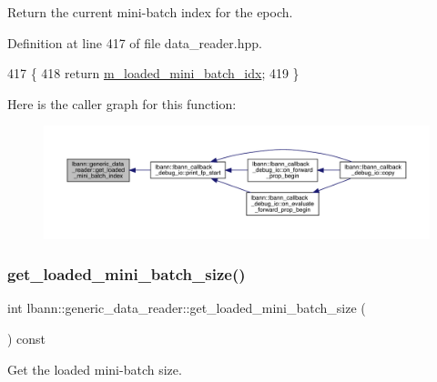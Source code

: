 Return the current mini-\/batch index for the epoch. 



Definition at line 417 of file data\+\_\+reader.\+hpp.


\begin{DoxyCode}
417                                           \{
418     \textcolor{keywordflow}{return} \hyperlink{classlbann_1_1generic__data__reader_a2cfc5a3e6de8a8a24d3525ec3ed586fb}{m\_loaded\_mini\_batch\_idx};
419   \}
\end{DoxyCode}
Here is the caller graph for this function\+:\nopagebreak
\begin{figure}[H]
\begin{center}
\leavevmode
\includegraphics[width=350pt]{classlbann_1_1generic__data__reader_a56dca946c200cc25f6eae6e507939bba_icgraph}
\end{center}
\end{figure}
\mbox{\label{classlbann_1_1generic__data__reader_a850e99110dd1e9df2985f09ea196fea8}} 
\subsubsection{\texorpdfstring{get\+\_\+loaded\+\_\+mini\+\_\+batch\+\_\+size()}{get\_loaded\_mini\_batch\_size()}}
{\footnotesize\ttfamily int lbann\+::generic\+\_\+data\+\_\+reader\+::get\+\_\+loaded\+\_\+mini\+\_\+batch\+\_\+size (\begin{DoxyParamCaption}{ }\end{DoxyParamCaption}) const}



Get the loaded mini-\/batch size. 



